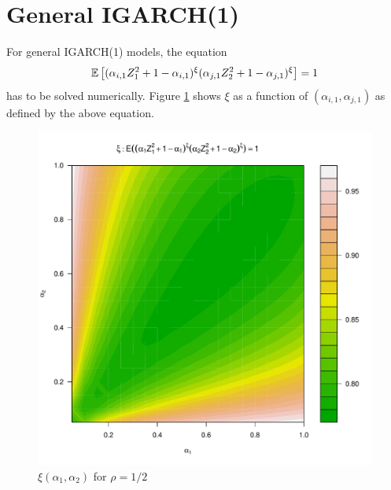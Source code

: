 \documentclass{article}
\begin{document}
\section{General IGARCH(1)}
For general IGARCH(1) models, the equation
\begin{equation*}
  \mathbb{E} \left[
    (
    \alpha_{i,1} Z_1^2 + 1 - \alpha_{i,1}
    )^\xi
    (
    \alpha_{j,1} Z_2^2 + 1 - \alpha_{j,1}
    )^\xi\right] = 1
\end{equation*}
has to be solved numerically. Figure \ref{fig:xi_rho0.5} shows $\xi$
as a function of $(\alpha_{i,1}, \alpha_{j,1})$ as defined by the
above equation.
\begin{figure}[htb!]
  \centering
  \includegraphics[scale=0.4]{igarch_rho0dot5.pdf}
  \caption{$\xi(\alpha_1, \alpha_2)$ for $\rho = 1/2$}
  \label{fig:xi_rho0.5}
\end{figure}
\end{document}
